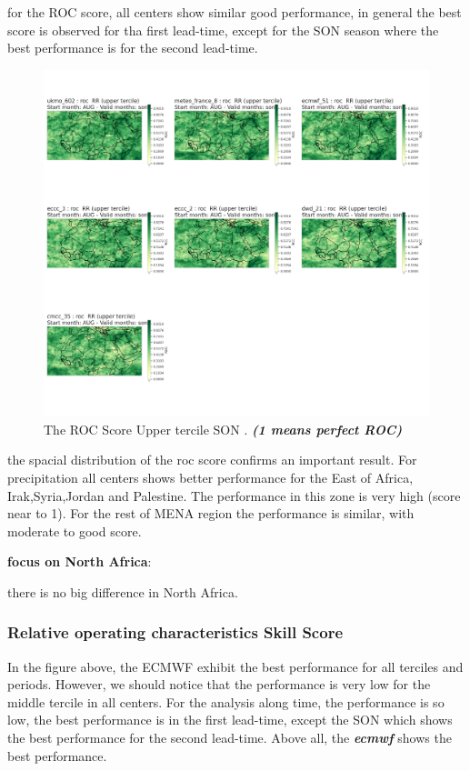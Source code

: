for the ROC score, all centers show similar good performance, in general the best score is observed for tha first lead-time, except for the SON season where the best performance is for the second lead-time.

\begin{figure}[H]
    \centering
    \includegraphics[scale=0.3]{plots/prob/roc/roc_son_RR_upper.png}
    \caption{The ROC Score Upper tercile SON    . \textbf{\textit{(1 means perfect ROC)}}}
\end{figure}

the spacial distribution of the roc score confirms an important result. For precipitation all centers shows better performance for the East of Africa, Irak,Syria,Jordan and Palestine. The performance in this zone is very high (score near to 1). For the rest of MENA region the performance is similar, with moderate to good score.

\vspace{1.5cm}
\textbf{focus on North Africa}:

there is no big difference in North Africa.


\subsubsection{Relative operating characteristics Skill Score}

In the figure above, the ECMWF exhibit the best performance for all terciles and periods. However, we should notice that the performance is very low for the middle tercile in all centers. For the analysis along time, the performance is so low, the best performance is in the first lead-time, except the SON which shows the best performance for the second lead-time. Above all, the \textbf{\textit{ecmwf}} shows the best performance.


